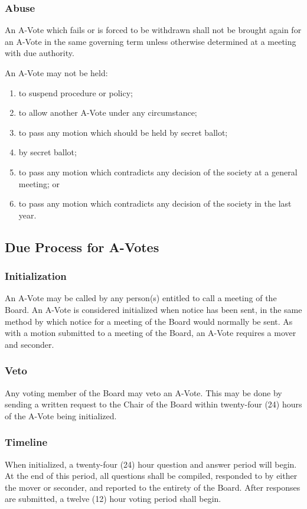 \subsubsection{Abuse}
An A-Vote which fails or is forced to be withdrawn shall not be brought again for an A-Vote in the same governing term unless otherwise determined at a meeting with due authority.

An A-Vote may not be held:
\begin{enumerate}
    \item to suspend procedure or policy;
    \item to allow another A-Vote under any circumstance;
    \item to pass any motion which should be held by secret ballot;
    \item by secret ballot;
    \item to pass any motion which contradicts any decision of the society at a general meeting; or
    \item to pass any motion which contradicts any decision of the society in the last year.
\end{enumerate}

\subsection{Due Process for A-Votes}

\subsubsection{Initialization}
An A-Vote may be called by any person(s) entitled to call a meeting of the Board. An A-Vote is considered initialized when notice has been sent, in the same method by which notice for a meeting of the Board would normally be sent. As with a motion submitted to a meeting of the Board, an A-Vote requires a mover and seconder.

\subsubsection{Veto}
Any voting member of the Board may veto an A-Vote. This may be done by sending a written request to the Chair of the Board within twenty-four (24) hours of the A-Vote being initialized.

\subsubsection{Timeline}
When initialized, a twenty-four (24) hour question and answer period will begin.  At the end of this period, all questions shall be compiled, responded to by either the mover or seconder, and reported to the entirety of the Board. After responses are submitted, a twelve (12) hour voting period shall begin.

